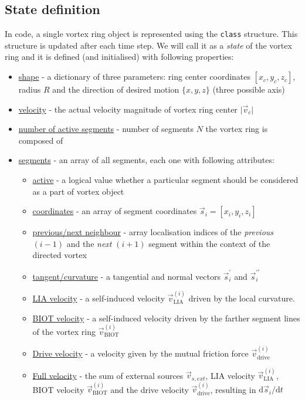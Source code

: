 \subsection*{State definition}

In code, a single vortex ring object is represented using the \texttt{class} structure. This structure is updated after each time step. We will call it as a \textit{state} of the vortex ring and it is defined (and initialised) with following properties:

\begin{itemize}
	\item \underline{shape} - a dictionary of three parameters: ring center coordinates $[x_c,y_c,z_c]$, radius $R$ and the direction of desired motion $\{x, y, z\}$ (three possible axis)
	\item \underline{velocity} - the actual velocity magnitude of vortex ring center $\vert \vec{v}_c \vert$
	\item \underline{number of active segments} - number of segments $N$ the vortex ring is composed of
	\item \underline{segments} - an array of all segments, each one with following attributes:
	\begin{itemize}
		\item \underline{active} - a logical value whether a particular segment should be considered as a part of vortex object
		\item \underline{coordinates} - an array of segment coordinates $\vec{s}_i = [x_i,y_i,z_i]$
		\item \underline{previous/next neighbour} - array localisation indices of the \textit{previous} $(i-1)$ and the \textit{next} $(i+1)$ segment within the context of the directed vortex
		\item \underline{tangent/curvature} - a tangential and normal vectors $\vec{s}^{\prime}_i$ and $\vec{s}^{\prime\prime}_i$

		\item \underline{LIA velocity} - a self-induced velocity $\vec{v}_{\text{LIA}}^{(i)}$ driven by the local curvature.
		\item \underline{BIOT velocity} - a self-induced velocity driven by the farther segment lines of the vortex ring $\vec{v}_{\text{BIOT}}^{(i)}$

		\item \underline{Drive velocity} - a velocity given by the mutual friction force $\vec{v}_{\text{drive}}^{(i)}$
		\item \underline{Full velocity} - the sum of external sources $\vec{v}_{s,ext}$, LIA velocity $\vec{v}_{\text{LIA}}^{(i)}$, BIOT velocity $\vec{v}_{\text{BIOT}}^{(i)}$ and the drive velocity $\vec{v}_{\text{drive}}^{(i)}$, resulting in $\text{d}\vec{s}_i / \text{d}t$
	\end{itemize}
\end{itemize}

